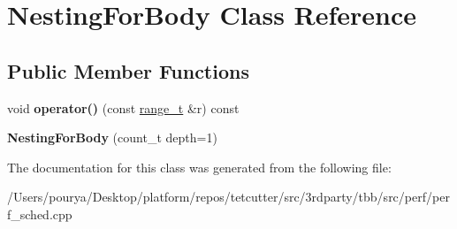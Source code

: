 \hypertarget{classNestingForBody}{}\section{Nesting\+For\+Body Class Reference}
\label{classNestingForBody}
\subsection*{Public Member Functions}
\begin{DoxyCompactItemize}
\item 
\hypertarget{classNestingForBody_a2d3fcc1a676d1f8924ac8db0f73f019f}{}void {\bfseries operator()} (const \hyperlink{classtbb_1_1blocked__range}{range\+\_\+t} \&r) const \label{classNestingForBody_a2d3fcc1a676d1f8924ac8db0f73f019f}

\item 
\hypertarget{classNestingForBody_a4cb53bef5639b7d0cbad8cca14be7b48}{}{\bfseries Nesting\+For\+Body} (count\+\_\+t depth=1)\label{classNestingForBody_a4cb53bef5639b7d0cbad8cca14be7b48}

\end{DoxyCompactItemize}


The documentation for this class was generated from the following file\+:\begin{DoxyCompactItemize}
\item 
/\+Users/pourya/\+Desktop/platform/repos/tetcutter/src/3rdparty/tbb/src/perf/perf\+\_\+sched.\+cpp\end{DoxyCompactItemize}
